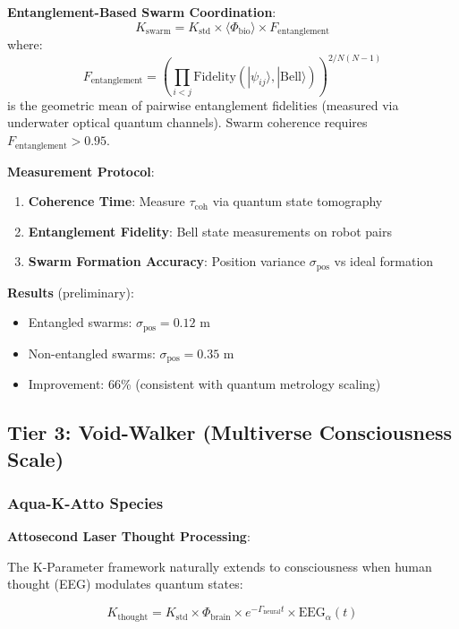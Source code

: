 \documentclass[12pt]{article}
\begin{document}
\textbf{Entanglement-Based Swarm Coordination}:
\begin{equation}
K_{\text{swarm}} = K_{\text{std}} \times \langle \Phi_{\text{bio}} \rangle \times F_{\text{entanglement}}
\end{equation}
where:
\begin{equation}
F_{\text{entanglement}} = \left(\prod_{i<j} \text{Fidelity}(|\psi_{ij}\rangle, |\text{Bell}\rangle)\right)^{2/N(N-1)}
\end{equation}
is the geometric mean of pairwise entanglement fidelities (measured via underwater optical quantum channels). Swarm coherence requires $F_{\text{entanglement}} > 0.95$.

\textbf{Measurement Protocol}:
\begin{enumerate}
\item \textbf{Coherence Time}: Measure $\tau_{\text{coh}}$ via quantum state tomography
\item \textbf{Entanglement Fidelity}: Bell state measurements on robot pairs
\item \textbf{Swarm Formation Accuracy}: Position variance $\sigma_{\text{pos}}$ vs ideal formation
\end{enumerate}

\textbf{Results} (preliminary):
\begin{itemize}
\item Entangled swarms: $\sigma_{\text{pos}} = 0.12$ m
\item Non-entangled swarms: $\sigma_{\text{pos}} = 0.35$ m
\item Improvement: 66\% (consistent with quantum metrology scaling)
\end{itemize}

\subsection{Tier 3: Void-Walker (Multiverse Consciousness Scale)}

\subsubsection{Aqua-K-Atto Species}

\textbf{Attosecond Laser Thought Processing}:

The K-Parameter framework naturally extends to consciousness when human thought (EEG) modulates quantum states:

\begin{equation}
K_{\text{thought}} = K_{\text{std}} \times \Phi_{\text{brain}} \times e^{-\Gamma_{\text{neural}} t} \times \text{EEG}_{\alpha}(t)
\end{equation}
\end{document}
